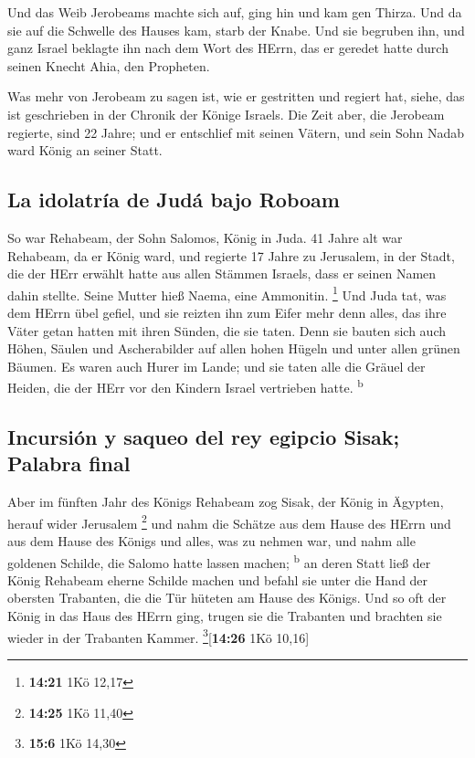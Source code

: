  Und das Weib Jerobeams machte sich auf, ging hin und kam
gen Thirza. Und da sie auf die Schwelle des Hauses kam, starb der Knabe.
 Und sie begruben ihn, und ganz Israel beklagte ihn nach
dem Wort des HErrn, das er geredet hatte durch seinen Knecht Ahia, den
Propheten.

 Was mehr von Jerobeam zu sagen ist, wie er gestritten
und regiert hat, siehe, das ist geschrieben in der Chronik der Könige
Israels.  Die Zeit aber, die Jerobeam regierte, sind 22
Jahre; und er entschlief mit seinen Vätern, und sein Sohn Nadab ward
König an seiner Statt.

\hypertarget{la-idolatruxeda-de-juduxe1-bajo-roboam}{%
\subsection{La idolatría de Judá bajo
Roboam}\label{la-idolatruxeda-de-juduxe1-bajo-roboam}}

 So war Rehabeam, der Sohn Salomos, König in Juda. 41
Jahre alt war Rehabeam, da er König ward, und regierte 17 Jahre zu
Jerusalem, in der Stadt, die der HErr erwählt hatte aus allen Stämmen
Israels, dass er seinen Namen dahin stellte. Seine Mutter hieß Naema,
eine Ammonitin. \footnote{\textbf{14:21} 1Kö 12,17}  Und
Juda tat, was dem HErrn übel gefiel, und sie reizten ihn zum Eifer mehr
denn alles, das ihre Väter getan hatten mit ihren Sünden, die sie taten.
 Denn sie bauten sich auch Höhen, Säulen und
Ascherabilder auf allen hohen Hügeln und unter allen grünen Bäumen.
 Es waren auch Hurer im Lande; und sie taten alle die
Gräuel der Heiden, die der HErr vor den Kindern Israel vertrieben hatte.
\textsuperscript{b}

\hypertarget{incursiuxf3n-y-saqueo-del-rey-egipcio-sisak-palabra-final}{%
\subsection{Incursión y saqueo del rey egipcio Sisak; Palabra
final}\label{incursiuxf3n-y-saqueo-del-rey-egipcio-sisak-palabra-final}}

 Aber im fünften Jahr des Königs Rehabeam zog Sisak, der
König in Ägypten, herauf wider Jerusalem \footnote{\textbf{14:25} 1Kö
  11,40}  und nahm die Schätze aus dem Hause des HErrn
und aus dem Hause des Königs und alles, was zu nehmen war, und nahm alle
goldenen Schilde, die Salomo hatte lassen machen; \textsuperscript{b}
 an deren Statt ließ der König Rehabeam eherne Schilde
machen und befahl sie unter die Hand der obersten Trabanten, die die Tür
hüteten am Hause des Königs.  Und so oft der König in das
Haus des HErrn ging, trugen sie die Trabanten und brachten sie wieder in
der Trabanten Kammer. \footnote{\textbf{15:6} 1Kö 14,30}{[}\textbf{14:26}
1Kö 10,16{]}

